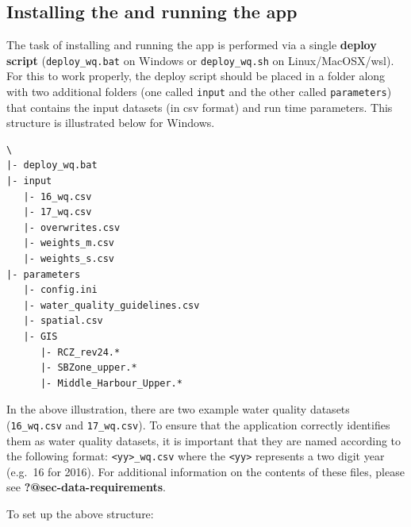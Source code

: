 \documentclass[
  8pt,
  a4paper]{article}
\begin{document}
\subsection{Installing the and running the
app}\label{installing-the-and-running-the-app}

The task of installing and running the app is performed via a single
\textbf{deploy script} (\texttt{deploy\_wq.bat} on Windows or
\texttt{deploy\_wq.sh} on Linux/MacOSX/wsl). For this to work properly,
the deploy script should be placed in a folder along with two additional
folders (one called \texttt{input} and the other called
\texttt{parameters}) that contains the input datasets (in csv format)
and run time parameters. This structure is illustrated below for
Windows.

\begin{verbatim}
\
|- deploy_wq.bat
|- input
   |- 16_wq.csv
   |- 17_wq.csv
   |- overwrites.csv
   |- weights_m.csv
   |- weights_s.csv
|- parameters
   |- config.ini
   |- water_quality_guidelines.csv
   |- spatial.csv
   |- GIS
      |- RCZ_rev24.*
      |- SBZone_upper.*
      |- Middle_Harbour_Upper.*
\end{verbatim}

\begin{tcolorbox}[enhanced jigsaw, leftrule=.75mm, left=2mm, toprule=.15mm, colbacktitle=quarto-callout-note-color!10!white, rightrule=.15mm, breakable, arc=.35mm, opacityback=0, toptitle=1mm, title=\textcolor{quarto-callout-note-color}{\faInfo}\hspace{0.5em}{Note}, titlerule=0mm, coltitle=black, colback=white, opacitybacktitle=0.6, colframe=quarto-callout-note-color-frame, bottomrule=.15mm, bottomtitle=1mm]

In the above illustration, there are two example water quality datasets
(\texttt{16\_wq.csv} and \texttt{17\_wq.csv}). To ensure that the
application correctly identifies them as water quality datasets, it is
important that they are named according to the following format:
\texttt{\textless{}yy\textgreater{}\_wq.csv} where the
\texttt{\textless{}yy\textgreater{}} represents a two digit year
(e.g.~16 for 2016). For additional information on the contents of these
files, please see \textbf{?@sec-data-requirements}.

\end{tcolorbox}

To set up the above structure:
\end{document}

